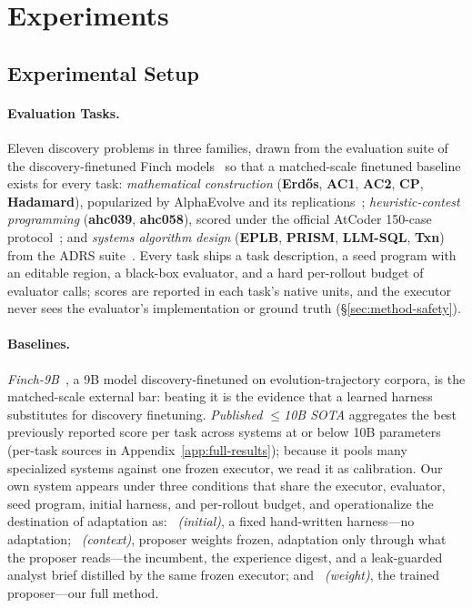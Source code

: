 \section{Experiments}
\label{sec:experiments}

\subsection{Experimental Setup}
\label{sec:exp-setup}

\paragraph{Evaluation Tasks.}  Eleven discovery problems in three families,
drawn from the evaluation suite of the discovery-finetuned Finch
models~\citep{finch} so that a matched-scale finetuned baseline exists for
every task: \emph{mathematical construction} (\textbf{Erd\H{o}s},
\textbf{AC1}, \textbf{AC2}, \textbf{CP}, \textbf{Hadamard}), popularized by
AlphaEvolve and its
replications~\citep{alphaevolve,alphaevolvemath,openevolve};
\emph{heuristic-contest programming} (\textbf{ahc039}, \textbf{ahc058}),
scored under the official AtCoder 150-case
protocol~\citep{ahc,alebench}; and \emph{systems algorithm design}
(\textbf{EPLB}, \textbf{PRISM}, \textbf{LLM-SQL}, \textbf{Txn}) from the
ADRS suite~\citep{barbarians}.  Every task ships a task description, a seed
program with an editable region, a black-box evaluator, and a hard
per-rollout budget of evaluator calls; scores are reported in each task's
native units, and the executor never sees the evaluator's implementation or
ground truth (\S\ref{sec:method-safety}).

\paragraph{Baselines.}  \emph{Finch-9B}~\citep{finch}, a 9B model
discovery-finetuned on evolution-trajectory corpora, is the matched-scale
external bar: beating it is the evidence that a learned harness substitutes
for discovery finetuning.  \emph{Published $\le$10B SOTA} aggregates the
best previously reported score per task across systems at or below 10B
parameters (per-task sources in Appendix~\ref{app:full-results}); because
it pools many specialized systems against one frozen executor, we read it as
calibration.  Our own system appears under three conditions that share the
executor, evaluator, seed program, initial harness, and per-rollout budget,
and operationalize the destination of adaptation as: \emph{\method~(initial)}, a
fixed hand-written harness---no adaptation; \emph{\method~(context)},
proposer weights frozen, adaptation only through what the proposer
reads---the incumbent, the experience digest, and a leak-guarded analyst
brief distilled by the same frozen executor; and \emph{\method~(weight)},
the trained proposer---our full method.

